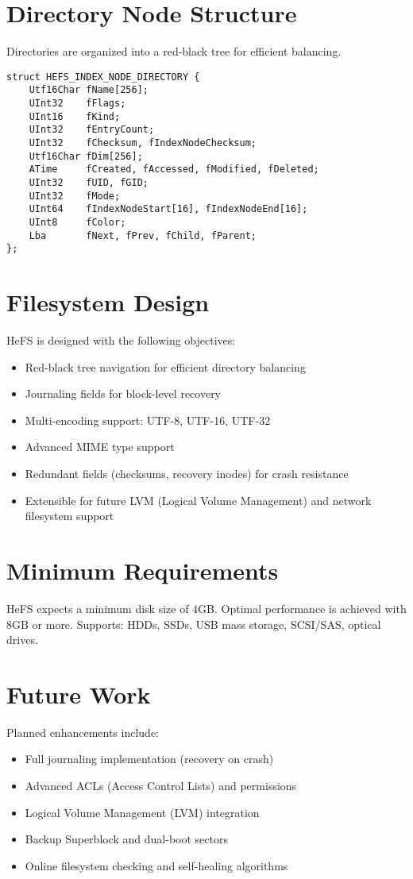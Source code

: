 \documentclass{article}
\begin{document}
\section{Directory Node Structure}
Directories are organized into a red-black tree for efficient balancing.

\begin{lstlisting}[style=cstyle, caption={HEFS\_INDEX\_NODE\_DIRECTORY structure}]
struct HEFS_INDEX_NODE_DIRECTORY {
    Utf16Char fName[256];
    UInt32    fFlags;
    UInt16    fKind;
    UInt32    fEntryCount;
    UInt32    fChecksum, fIndexNodeChecksum;
    Utf16Char fDim[256];
    ATime     fCreated, fAccessed, fModified, fDeleted;
    UInt32    fUID, fGID;
    UInt32    fMode;
    UInt64    fIndexNodeStart[16], fIndexNodeEnd[16];
    UInt8     fColor;
    Lba       fNext, fPrev, fChild, fParent;
};
\end{lstlisting}

\section{Filesystem Design}

HeFS is designed with the following objectives:
\begin{itemize}
    \item Red-black tree navigation for efficient directory balancing
    \item Journaling fields for block-level recovery
    \item Multi-encoding support: UTF-8, UTF-16, UTF-32
    \item Advanced MIME type support
    \item Redundant fields (checksums, recovery inodes) for crash resistance
    \item Extensible for future LVM (Logical Volume Management) and network filesystem support
\end{itemize}

\section{Minimum Requirements}

HeFS expects a minimum disk size of 4GB. Optimal performance is achieved with 8GB or more.
Supports: HDDs, SSDs, USB mass storage, SCSI/SAS, optical drives.

\section{Future Work}
Planned enhancements include:
\begin{itemize}
    \item Full journaling implementation (recovery on crash)
    \item Advanced ACLs (Access Control Lists) and permissions
    \item Logical Volume Management (LVM) integration
    \item Backup Superblock and dual-boot sectors
    \item Online filesystem checking and self-healing algorithms
\end{itemize}
\end{document}
